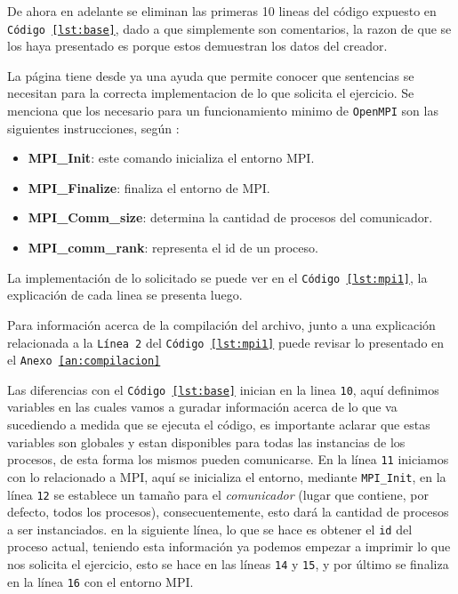\documentclass{article}
\begin{document}
De ahora en adelante se eliminan las primeras 10 lineas del código expuesto en
\texttt{C\'odigo \ref{lst:base}}, dado a que simplemente son comentarios, la
razon de que se los haya presentado es porque estos demuestran los datos del creador.

La página tiene desde ya una ayuda que permite conocer que sentencias se
necesitan para la correcta implementacion de lo que solicita el ejercicio. Se
menciona que los necesario para un funcionamiento minimo de \texttt{OpenMPI}
son las siguientes instrucciones, según \cite{pylp32018}:
\begin{itemize}
\item \textbf{MPI\_Init}: este comando inicializa el entorno MPI.
\item \textbf{MPI\_Finalize}: finaliza el entorno de MPI.
\item \textbf{MPI\_Comm\_size}: determina la cantidad de procesos del
comunicador.
\item \textbf{MPI\_comm\_rank}: representa el id de un proceso.
\end{itemize}

La implementación de lo solicitado se puede ver en el \texttt{Código
\ref{lst:mpi1}}, la explicación de cada linea se presenta luego.



Para informaci\'on acerca de la compilaci\'on del archivo, junto a una
explicaci\'on relacionada a la \texttt{L\'inea 2} del \texttt{C\'odigo
\ref{lst:mpi1}} puede revisar lo presentado en el \texttt{Anexo \ref{an:compilacion}}

Las diferencias con el \texttt{C\'odigo \ref{lst:base}} inician en la linea
\texttt{10}, aqu\'i definimos variables en las cuales vamos a guradar
informaci\'on acerca de lo que va sucediendo a medida que se ejecuta el
c\'odigo, es importante aclarar que estas variables son globales y estan
disponibles para todas las instancias de los procesos, de esta forma los mismos
pueden comunicarse. En la l\'inea \texttt{11} iniciamos con lo relacionado a MPI, aqu\'i
se inicializa el entorno, mediante \texttt{MPI\_Init}, en la l\'inea \texttt{12}
se establece un tamaño para el \textit{comunicador} (lugar que contiene, por
defecto, todos los procesos), consecuentemente, esto dar\'a la cantidad de
procesos a ser instanciados. en la siguiente l\'inea, lo que se hace es obtener
el \texttt{id} del proceso actual, teniendo esta informaci\'on ya podemos
empezar a imprimir lo que nos solicita el ejercicio, esto se hace en las l\'ineas
\texttt{14} y \texttt{15}, y por \'ultimo se finaliza en la l\'inea \texttt{16}
con el entorno MPI.
\end{document}
